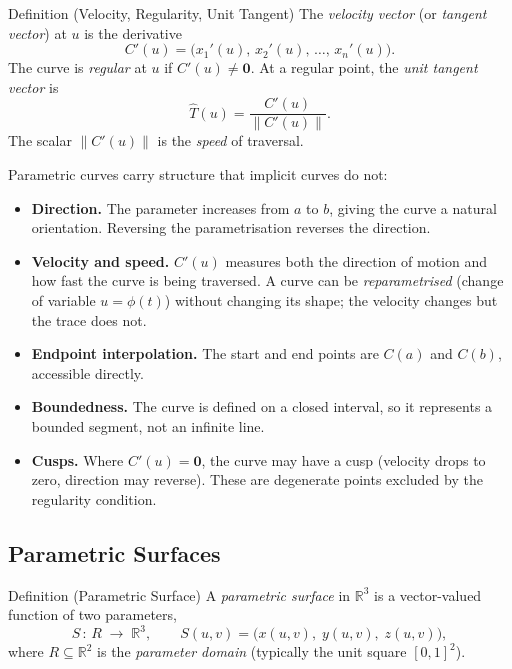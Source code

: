\begin{propositionbox}{Definition (Velocity, Regularity, Unit Tangent)}
The \emph{velocity vector} (or \emph{tangent vector}) at $u$ is the derivative
\[
  C'(u) = \bigl(x_1'(u),\,x_2'(u),\,\ldots,\,x_n'(u)\bigr).
\]
The curve is \emph{regular} at $u$ if $C'(u) \neq \mathbf{0}$.
At a regular point, the \emph{unit tangent vector} is
\[
  \hat{T}(u) = \frac{C'(u)}{\|C'(u)\|}.
\]
The scalar $\|C'(u)\|$ is the \emph{speed} of traversal.
\end{propositionbox}

\begin{remark*}
Parametric curves carry structure that implicit curves do not:
\begin{itemize}
  \item \textbf{Direction.}
        The parameter increases from $a$ to $b$, giving the curve
        a natural orientation.
        Reversing the parametrisation reverses the direction.
  \item \textbf{Velocity and speed.}
        $C'(u)$ measures both the direction of motion and how fast
        the curve is being traversed.
        A curve can be \emph{reparametrised} (change of variable
        $u = \phi(t)$) without changing its shape;
        the velocity changes but the trace does not.
  \item \textbf{Endpoint interpolation.}
        The start and end points are $C(a)$ and $C(b)$, accessible directly.
  \item \textbf{Boundedness.}
        The curve is defined on a closed interval, so it represents
        a bounded segment, not an infinite line.
  \item \textbf{Cusps.}
        Where $C'(u) = \mathbf{0}$, the curve may have a cusp
        (velocity drops to zero, direction may reverse).
        These are degenerate points excluded by the regularity condition.
\end{itemize}
\end{remark*}

\subsection*{Parametric Surfaces}

\begin{propositionbox}{Definition (Parametric Surface)}
A \emph{parametric surface} in $\mathbb{R}^3$ is a vector-valued function
of two parameters,
\[
  S\,:\,R\;\longrightarrow\;\mathbb{R}^3, \qquad
  S(u,v) = \bigl(x(u,v),\;y(u,v),\;z(u,v)\bigr),
\]
where $R\subseteq\mathbb{R}^2$ is the \emph{parameter domain}
(typically the unit square $[0,1]^2$).
\end{propositionbox}

